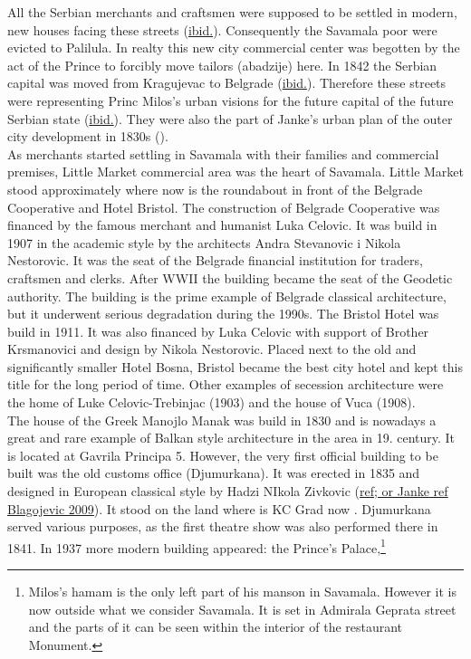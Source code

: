 \documentclass[11pt]{report}
\begin{document}
All  the  Serbian  merchants  and  craftsmen  were supposed  to  be settled in modern, new  houses facing these streets (\href{ref}{ibid.}).
Consequently the Savamala poor were evicted to Palilula. 
In realty this new city commercial center was begotten by the act of the Prince to forcibly move tailors (abadzije) here.
In 1842 the Serbian capital was moved from Kragujevac to Belgrade (\href{ref}{ibid.}).
Therefore these streets were representing Princ Milos’s urban visions for the future capital of the future Serbian state (\href{ref}{ibid.}).
They were also the part of Janke’s urban plan of the outer city development in 1830s (\href{ref}{\citealt{blagojevic_urban_2009}}). 
\\
As merchants started settling in Savamala with their families and commercial premises, Little Market commercial area was the heart of Savamala.
Little Market stood approximately where now is the roundabout in front of the Belgrade Cooperative and Hotel Bristol.
The construction of Belgrade Cooperative was financed by the famous merchant and humanist Luka Celovic.
It was build in 1907 in the academic style by the architects Andra Stevanovic i Nikola Nestorovic.
It was the seat of the Belgrade financial institution for traders, craftsmen and clerks.
After WWII the building became the seat of the Geodetic authority.
The building is the prime example of Belgrade classical architecture, but it underwent serious degradation during the 1990s.
The Bristol Hotel was build in 1911.
It was also financed by Luka Celovic with support of Brother Krsmanovici and design by Nikola Nestorovic. Placed next to the old and significantly smaller Hotel Bosna, Bristol became the best city hotel and kept this title for the long period of time.
Other examples of secession architecture were the home of Luke Celovic-Trebinjac (1903) and the house of Vuca (1908).
\\
The house of the Greek Manojlo Manak was build in 1830 and is nowadays a great and rare example of Balkan style architecture in the area in 19. century. It is located at Gavrila Principa 5.
However, the very first official building to be built was the old customs office (Djumurkana). It was erected in 1835 and designed in European classical style by Hadzi NIkola Zivkovic (\href{ref}{ref; or Janke ref Blagojevic 2009}). It stood on the land where is KC Grad now . Djumurkana served various purposes, as the first theatre show was also performed there in 1841.
In 1937 more modern building appeared: the Prince's Palace,\footnote{Milos's hamam is the only left part of his manson in Savamala. However it is now outside what we consider Savamala. It is set in Admirala Geprata street and the parts of it can be seen within the interior of the restaurant Monument.}
\end{document}
